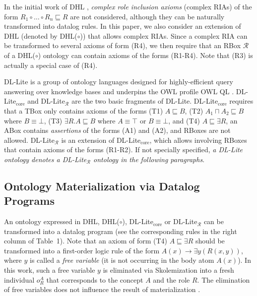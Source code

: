 In the initial work of DHL \cite{GrosofHVD03}, \emph{complex role inclusion axioms} (complex RIAs) of
the form $R_1\circ\ldots\circ R_n\sqsubseteq R$ are not considered, although they can be
naturally transformed into datalog rules.
In this paper, we also consider an extension of DHL (denoted by DHL($\circ$))
that allows complex RIAs. Since a complex RIA can be transformed to
several axioms of form (R4), we then require that an
RBox $\mathcal{R}$ of a DHL($\circ$) ontology can contain
axioms of the forms (R1-R4). Note that (R3) is actually a special
case of (R4).

DL-Lite is a group of ontology languages designed for highly-efficient
query answering over knowledge bases
and underpins the OWL profile OWL QL \cite{CalvaneseGLLR07}.
DL-Lite$_{\text{core}}$ and DL-Lite$_{\mathcal{R}}$ are the two basic fragments
of DL-Lite.
DL-Lite$_{\text{core}}$ requires that a TBox only contains axioms of the forms (T1) $A\sqsubseteq B$,
(T2) $A_1\sqcap A_2\sqsubseteq B$ where $B\equiv\bot$, (T3) $\exists R.A\sqsubseteq B$
where $A\equiv\top$ or $B\equiv\bot$, and (T4) $A\sqsubseteq\exists R$,
an ABox contains \emph{assertions} of the forms (A1) and (A2), and
RBoxes are not allowed. DL-Lite$_{\mathcal{R}}$ is an extension of DL-Lite$_{\text{core}}$,
which allows involving RBoxes that contain axioms of the forms (R1-R2).
If not specially specified, \emph{a DL-Lite ontology denotes a DL-Lite$_{\mathcal{R}}$ ontology
in the following paragraphs}.


\subsection{Ontology Materialization via Datalog Programs}

An ontology
expressed in DHL, DHL($\circ$), DL-Lite$_{\text{core}}$ or DL-Lite$_{\mathcal{R}}$ can be transformed into a datalog program
(see the corresponding rules in the right column of Table~1).
Note that an axiom of form (T4) $A\sqsubseteq\exists R$ should be
transformed into a
first-order logic rule of the form $A(x)\rightarrow \exists y(R(x,y))$, where $y$ is called a \emph{free variable} (it is
not occurring in the body atom $A(x)$).
In this work, such a free variable $y$ is eliminated via Skolemization into a fresh individual $o_{R}^A$
that corresponds to the concept $A$ and the role $R$. The elimination of free variables
does not influence the result of materialization \cite{CalvaneseGLLR07}.


